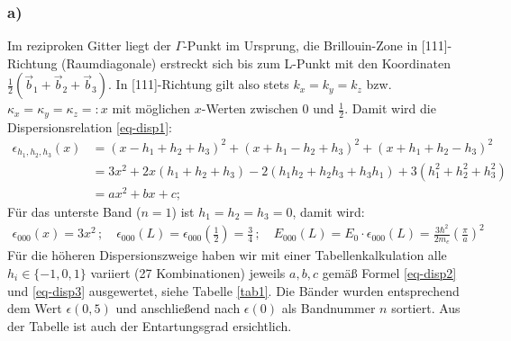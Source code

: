 \subsubsection*{a)}
Im reziproken Gitter liegt der $\Gamma$-Punkt im Ursprung, die Brillouin-Zone
in [111]-Richtung (Raumdiagonale) erstreckt sich bis zum L-Punkt mit den
Koordinaten $\frac{1}{2} (\vec b_1 + \vec b_2 + \vec b_3)$. In [111]-Richtung
gilt also stets $k_x = k_y = k_z$ bzw. $\kappa_x = \kappa_y = \kappa_z =: x$
mit möglichen $x$-Werten zwischen 0 und $\frac{1}{2}$.
Damit wird die Dispersionsrelation \eqref{eq-disp1}:
\begin{align}
\nonumber
\epsilon_{h_1, h_2, h_3}(x) &= (x-h_1+h_2+h_3 )^2 + (x+h_1-h_2+h_3 )^2 + (x+h_1+h_2-h_3 )^2 \\
\label{eq-disp2}
& = 3 x^2 + 2 x (h_1+h_2+h_3) -2 (h_1 h_2 + h_2 h_3 + h_3 h_1) + 3 (h_1^2 + h_2^2 + h_3^2)\\
\label{eq-disp3}
& = a x^2 + b x + c;
\end{align}
Für das unterste Band ($n = 1$) ist $h_1 =  h_2 =  h_3 = 0$, damit wird:
\begin{align*}
  \epsilon_{000}(x) = 3 x^2 \,;\quad
  \epsilon_{000}(L) = \epsilon_{000}\left(\frac{1}{2}\right) = \frac{3}{4} \,;\quad
  E_{000}(L) = E_0 \cdot \epsilon_{000}(L) = \frac{3 \hbar^2}{2 m_e} \left(\frac{\pi}{a}\right)^2
\end{align*}
Für die höheren Dispersionszweige haben wir mit einer Tabellenkalkulation alle $h_i \in \{-1, 0, 1\}$
variiert (27 Kombinationen) jeweils $a, b, c$ gemäß Formel \eqref{eq-disp2}
und \eqref{eq-disp3} ausgewertet, siehe Tabelle \ref{tab1}. Die Bänder wurden
entsprechend dem Wert $\epsilon(0,5)$ und anschließend nach $\epsilon(0)$
als Bandnummer $n$ sortiert. Aus der Tabelle ist auch der Entartungsgrad ersichtlich.
